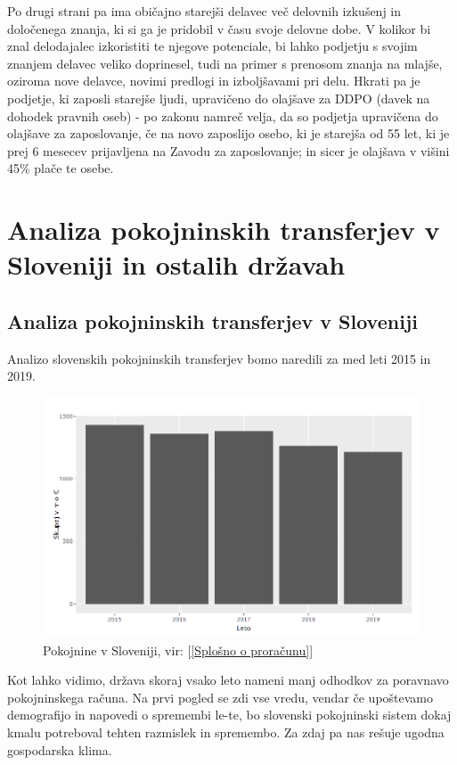 \documentclass[12pt, a4paper]{article}
\begin{document}
\hspace*{5mm} Po drugi strani pa ima običajno starejši delavec več delovnih izkušenj in določenega znanja, ki si ga je pridobil v času svoje delovne dobe. V kolikor bi znal delodajalec izkoristiti te njegove potenciale, bi lahko podjetju s svojim znanjem delavec veliko doprinesel, tudi na primer s prenosom znanja na mlajše, oziroma nove delavce, novimi predlogi in izboljšavami pri delu. Hkrati pa je podjetje, ki zaposli starejše ljudi, upravičeno do olajšave za DDPO (davek na dohodek pravnih oseb) - po zakonu namreč velja, da so podjetja upravičena do olajšave za zaposlovanje, če na novo zaposlijo osebo, ki je starejša od 55 let, ki je prej 6 mesecev prijavljena na Zavodu za zaposlovanje; in sicer je olajšava v višini 45\% plače te osebe. 

\newpage
\section[Analiza pokojninskih transferjev v Sloveniji in ostalih državah]{Analiza pokojninskih transferjev v Sloveniji in ostalih državah}
\subsection{Analiza pokojninskih transferjev v Sloveniji}
Analizo slovenskih pokojninskih transferjev bomo naredili za med leti 2015 in 2019. 

\begin{figure}[h!]
\centering
\includegraphics[width = 13 cm]{pokojnine_slovenija.png}
\caption{Pokojnine v Sloveniji, vir: [\ref{Splošno o proračunu}]}
\label{Slika 4}
\end{figure}
Kot lahko vidimo, država skoraj vsako leto nameni manj odhodkov za poravnavo pokojninskega računa. Na prvi pogled se zdi vse vredu, vendar če upoštevamo demografijo in napovedi o spremembi le-te, bo slovenski pokojninski sistem dokaj kmalu potreboval tehten razmislek in spremembo. Za zdaj pa nas rešuje ugodna gospodarska klima.
\end{document}
